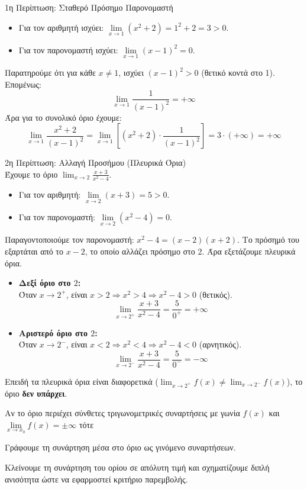 \documentclass[a4paper,11pt,twoside]{article}
\def\xrwma{red!80!black}
\newcommand{\kerkissans}[1]{{\fontfamily{maksf}\selectfont {#1}}}
\newcounter{askhsh}[section]
\renewcommand{\theaskhsh}{\thesection.\arabic{askhsh}}
\newcommand{\Askhsh}{\refstepcounter{askhsh}{\textbf{\textcolor{\xrwma}{\faPenSquare\ \  \large \kerkissans{\textbf{Άσκηση\hspace{2mm}\theaskhsh}}}}}\hspace{1mm}}{}
\newenvironment{askhsh}[1]
{\begin{tcolorbox}[title=\Askhsh\ \ :\ \  {\textcolor{black}{\kerkissans{\bmath{#1}}}},breakable,
enhanced standard,titlerule=-.2pt,toprule=0pt, rightrule=0pt, bottomrule=0pt,
colback=white,left=2mm,top=1mm,bottom=0mm,
boxrule=0pt,
colframe=white,borderline west={1.5mm}{0pt}{\xrwma},leftrule=2mm,sharp corners,coltitle=\xrwma]}
{\end{tcolorbox}}
\newcommand{\bhmata}{\textcolor{red!80!black}{\kerkissans{{\large \textbf{Βήματα}\\\vspace{-7mm}}}}}
\begin{document}
\begin{alist}
\item  1η Περίπτωση: Σταθερό Πρόσημο Παρονομαστή
\begin{itemize}
    \item Για τον αριθμητή ισχύει: $\lim\limits_{x\to 1} (x^2+2) = 1^2 + 2 = 3 > 0$.
    \item Για τον παρονομαστή ισχύει: $\lim\limits_{x\to 1} (x-1)^2 = 0$.
\end{itemize}
Παρατηρούμε ότι για κάθε $x \neq 1$, ισχύει $(x-1)^2 > 0$ (θετικό κοντά στο 1).
\\
Επομένως:
\[ \lim_{x\to 1} \frac{1}{(x-1)^2} = +\infty \]
Άρα για το συνολικό όριο έχουμε:
\[ \lim_{x\to 1} \frac{x^2+2}{(x-1)^2} = \lim_{x\to 1} \left[ (x^2+2) \cdot \frac{1}{(x-1)^2} \right] = 3 \cdot (+\infty) = +\infty \]

\vspace{0.5cm}
\item  2η Περίπτωση: Αλλαγή Προσήμου (Πλευρικά Όρια)
\\
Έχουμε το όριο $\displaystyle \lim_{x\to 2} \frac{x+3}{x^2-4}$.
\begin{itemize}
    \item Για τον αριθμητή: $\lim\limits_{x\to 2} (x+3) = 5 > 0$.
    \item Για τον παρονομαστή: $\lim\limits_{x\to 2} (x^2-4) = 0$.
\end{itemize}
Παραγοντοποιούμε τον παρονομαστή: $x^2-4 = (x-2)(x+2)$. Το πρόσημό του εξαρτάται από το $x-2$, το οποίο αλλάζει πρόσημο στο 2. Άρα εξετάζουμε πλευρικά όρια.
\begin{itemize}
    \item \textbf{Δεξί όριο στο $2$:}
    \\
    Όταν $x \to 2^+$, είναι $x > 2 \Rightarrow x^2 > 4 \Rightarrow x^2-4 > 0$ (θετικός).
    \[ \lim_{x\to 2^+} \frac{x+3}{x^2-4} = \frac{5}{0^+} = +\infty \]
    
    \item \textbf{Αριστερό όριο στο $2$:}
    \\
    Όταν $x \to 2^-$, είναι $x < 2 \Rightarrow x^2 < 4 \Rightarrow x^2-4 < 0$ (αρνητικός).
    \[ \lim_{x\to 2^-} \frac{x+3}{x^2-4} = \frac{5}{0^-} = -\infty \]
\end{itemize}
Επειδή τα πλευρικά όρια είναι διαφορετικά ($\lim_{x\to 2^+} f(x) \neq \lim_{x\to 2^-} f(x)$), το όριο \textbf{δεν υπάρχει}.
\end{alist}
\begin{askhsh}{Όρια με τριγωνομετρικές συναρτήσεις $ \hm{f(x)},\syn{f(x)} $ - Μηδενική επί φραγμένη}
Αν το όριο περιέχει σύνθετες τριγωνομετρικές συναρτήσεις με γωνία $ f(x) $ και $ \lim\limits_{x\to x_0}{f(x)}=\pm\infty $ τότε
\\\bhmata\begin{bhma}
\item Γράφουμε τη συνάρτηση μέσα στο όριο ως γινόμενο συναρτήσεων. 
\item Κλείνουμε τη συνάρτηση του ορίου σε απόλυτη τιμή και σχηματίζουμε διπλή ανισότητα ώστε να εφαρμοστεί κριτήριο παρεμβολής.
\end{bhma}
\end{askhsh}
\end{document}
